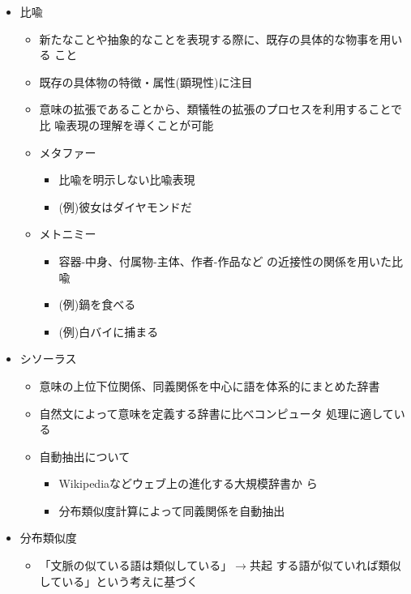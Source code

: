 \documentclass{jsarticle}
\begin{document}
\begin{itemize}
\begin{itemize}
\begin{itemize}
\begin{itemize}
		     \end{itemize}
	      \end{itemize}
	\item 比喩
	      \begin{itemize}
	       \item 新たなことや抽象的なことを表現する際に、既存の具体的な物事を用いる
		     こと
	       \item 既存の具体物の特徴・属性(顕現性)に注目
	       \item 意味の拡張であることから、類犠牲の拡張のプロセスを利用することで比
		     喩表現の理解を導くことが可能
	       \item メタファー
		     \begin{itemize}
		      \item 比喩を明示しない比喩表現
		      \item (例)彼女はダイヤモンドだ
		     \end{itemize}
	       \item メトニミー
		     \begin{itemize}
		      \item 容器-中身、付属物-主体、作者-作品など
			    の近接性の関係を用いた比喩
		      \item (例)鍋を食べる
		      \item (例)白バイに捕まる
		     \end{itemize}
	      \end{itemize}
	\item シソーラス
	      \begin{itemize}
	       \item 意味の上位下位関係、同義関係を中心に語を体系的にまとめた辞書
	       \item 自然文によって意味を定義する辞書に比べコンピュータ
		     処理に適している
	       \item 自動抽出について
		     \begin{itemize}
		      \item Wikipediaなどウェブ上の進化する大規模辞書か
			    ら
		      \item 分布類似度計算によって同義関係を自動抽出			   
		     \end{itemize}
	      \end{itemize}
	\item 分布類似度
	      \begin{itemize}
	       \item 「文脈の似ている語は類似している」$\rightarrow$共起
		     する語が似ていれば類似している」という考えに基づく

\end{itemize}
\end{itemize}
\end{itemize}
\end{document}
